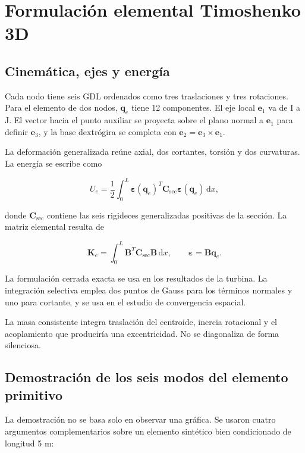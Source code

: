 \documentclass[oneside,a4paper,spanish,links]{amca}
\begin{document}
\section{Formulación elemental Timoshenko 3D}

\subsection{Cinemática, ejes y energía}

Cada nodo tiene seis GDL ordenados como tres traslaciones y tres rotaciones. Para el elemento de dos nodos, $\bm q_e$ tiene 12 componentes. El eje local $\bm e_1$ va de I a J. El vector hacia el punto auxiliar se proyecta sobre el plano normal a $\bm e_1$ para definir $\bm e_3$, y la base dextrógira se completa con $\bm e_2=\bm e_3\times\bm e_1$.

La deformación generalizada reúne axial, dos cortantes, torsión y dos curvaturas. La energía se escribe como

\[
U_e=\frac{1}{2}\int_0^L
\bm\varepsilon(\bm q_e)^T\bm C_{\mathrm{sec}}
\bm\varepsilon(\bm q_e)\,\mathrm dx,
\]

donde $\bm C_{\mathrm{sec}}$ contiene las seis rigideces generalizadas positivas de la sección. La matriz elemental resulta de

\[
\bm K_e=\int_0^L\bm B^T\bm C_{\mathrm{sec}}\bm B\,\mathrm dx,
\qquad
\bm\varepsilon=\bm B\bm q_e.
\]

La formulación cerrada exacta se usa en los resultados de la turbina. La integración selectiva emplea dos puntos de Gauss para los términos normales y uno para cortante, y se usa en el estudio de convergencia espacial.

La masa consistente integra traslación del centroide, inercia rotacional y el acoplamiento que produciría una excentricidad. No se diagonaliza de forma silenciosa.

\subsection{Demostración de los seis modos del elemento primitivo}

La demostración no se basa solo en observar una gráfica. Se usaron cuatro argumentos complementarios sobre un elemento sintético bien condicionado de longitud 5 m:
\end{document}
